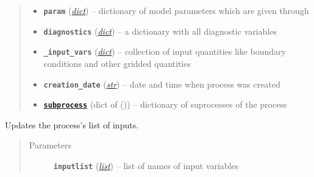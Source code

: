 \documentclass[a4paper,10pt,english]{sphinxmanual}
\begin{document}
\begin{fulllineitems}
\begin{quote}
\begin{description}
\begin{itemize}
\item {} 
\textbf{\texttt{param}} (\href{http://docs.python.org/2.7/library/stdtypes.html\#dict}{\emph{dict}}) -- dictionary of model parameters which are given
through 

\item {} 
\textbf{\texttt{diagnostics}} (\href{http://docs.python.org/2.7/library/stdtypes.html\#dict}{\emph{dict}}) -- a dictionary with all diagnostic variables

\item {} 
\textbf{\texttt{\_input\_vars}} (\href{http://docs.python.org/2.7/library/stdtypes.html\#dict}{\emph{dict}}) -- collection of input quantities like boundary conditions
and other gridded quantities

\item {} 
\textbf{\texttt{creation\_date}} (\href{http://docs.python.org/2.7/library/functions.html\#str}{\emph{str}}) -- date and time when process was created

\item {} 
\href{http://docs.python.org/2.7/library/subprocess.html\#module-subprocess}{\textbf{\texttt{subprocess}}} (dict of {\hyperref[api/climlab.process:climlab.process.process.Process]{\emph{}}} ()) -- dictionary of suprocesses of the process

\end{itemize}

\end{description}\end{quote}

\begin{fulllineitems}
\label{api/climlab.process:climlab.process.process.Process.add_input}
Updates the process's list of inputs.
\begin{quote}\begin{description}
\item[{Parameters}] \leavevmode
\textbf{\texttt{inputlist}} (\href{http://docs.python.org/2.7/library/functions.html\#list}{\emph{list}}) -- list of names of input variables

\end{description}\end{quote}

\end{fulllineitems}


\end{fulllineitems}
\end{document}
